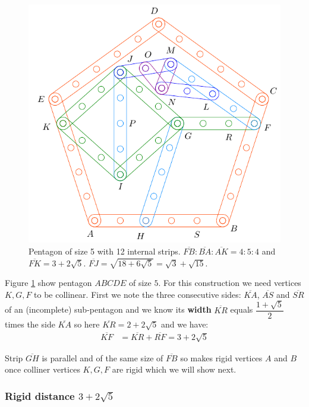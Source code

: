 \documentclass[11pt]{article}
\begin{document}
\begin{figure}[H]
\centering
\includegraphics[scale=0.9]{5/penta5-12a}
\caption{Pentagon of size 5 with 12 internal strips. $\overline{FB} : \overline{BA} : \overline{AK} = 4:5:4$ and $\overline{FK} = 3 + 2\sqrt5$. $\overline{FJ} = \sqrt{18+6\sqrt5} = \sqrt3 + \sqrt{15}$.}
\label{fig:penta5-12a}
\end{figure}

Figure \ref{fig:penta5-12a} show pentagon $ABCDE$ of size $5$. For this construction we need vertices $K,G,F$ to be collinear. First we note the three consecutive sides: $\overline{KA}$, $\overline{AS}$ and $\overline{SR}$ of an (incomplete) sub-pentagon and we know its \textbf{width} $\overline{KR}$ equals $\dfrac{1+\sqrt5}2$ times the side $\overline{KA}$ so here $\overline{KR} = 2 + 2\sqrt5$ and we have:
\begin{align}
\overline{KF} &= \overline{KR} + \overline{RF} = 3 + 2\sqrt5
\end{align}

Strip $\overline{GH}$ is parallel and of the same size of $\overline{FB}$ so makes rigid vertices $A$ and $B$ once colliner vertices $K,G,F$ are rigid which we will show next.

\subsubsection{Rigid distance $3+2\sqrt5$}
\end{document}
